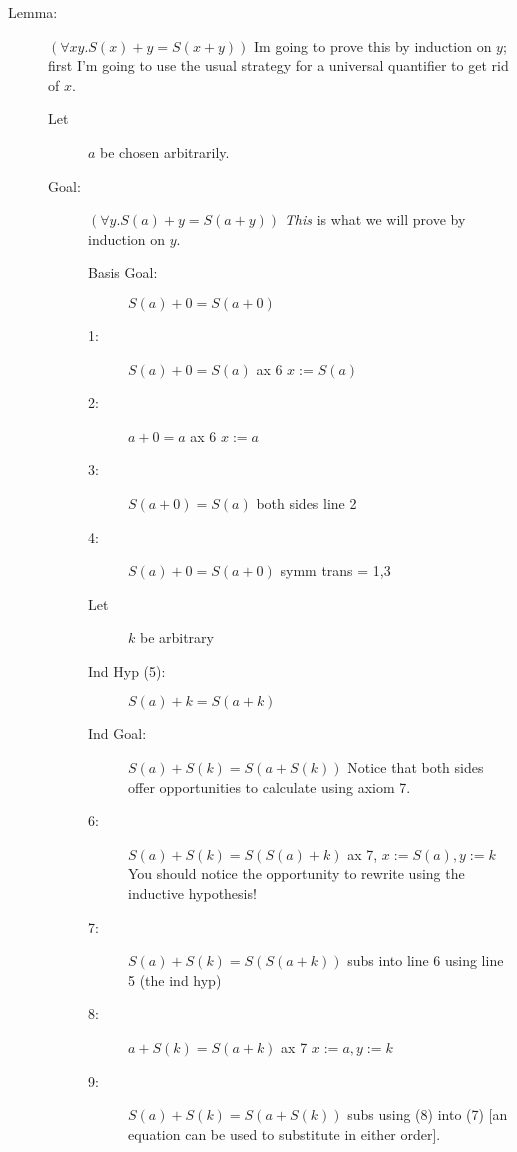 \documentclass[12pt]{book}
\begin{document}
\begin{description}

\item[Lemma:]  $(\forall xy.S(x)+y=S(x+y))$  Im going to prove this by induction on $y$; first I'm going to use the usual strategy for a universal quantifier to get rid of $x$.

\begin{description}

\item[Let] $a$ be chosen arbitrarily.

\item[Goal:]  $(\forall y.S(a)+y = S(a+y))$  {\em This\/} is what we will prove by induction on $y$.

\begin{description}

\item[Basis Goal:]  $S(a)+0 =S(a+0)$

\item[1:]  $S(a)+0=S(a)$  ax 6 $x:=S(a)$

\item[2:]  $a+0=a$  ax 6 $x:=a$

\item[3:]  $S(a+0)=S(a)$  both sides line 2

\item [4:]  $S(a)+0 =S(a+0)$  symm trans = 1,3

\item[Let] $k$ be arbitrary

\item[Ind Hyp (5):]  $S(a)+k=S(a+k)$

\item[Ind Goal:]  $S(a)+S(k) = S(a+S(k))$  Notice that both sides offer opportunities to calculate using axiom 7.

\item[6:]  $S(a)+S(k) = S(S(a)+k)$  ax 7, $x:=S(a), y:=k$  You should notice the opportunity to rewrite using the inductive hypothesis!

\item[7:]  $S(a)+S(k) = S(S(a+k))$  subs into line 6 using line 5 (the ind hyp)

\item[8:]  $a+S(k)=S(a+k)$  ax 7 $x:=a,y:=k$

\item[9:]  $S(a)+S(k) = S(a+S(k))$  subs using (8) into (7)  [an equation can be used to substitute in either order].

\end{description}


\end{description}

\end{description}
\end{document}
